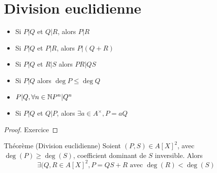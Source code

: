\documentclass[]{report}
\begin{document}
    \section{Division euclidienne}

    \begin{df}{}{}
        $(P,Q)\in A[X]$. On dit que $P|Q$ ($P$ divise $Q$) si $$\exists R\in A[X],Q=PR\text{ (Pour $Q\neq0$)$$
    \end{df}

    \begin{prop}{}{}
        \begin{itemize}
            \item Si $P|Q$ et $Q|R$, alors $P|R$
            \item Si $P|Q$ et $P|R$, alors $P|(Q+R)$
            \item Si $P|Q$ et $R|S$ alors $PR|QS$
            \item Si $P|Q$ alors $\deg P \le \deg Q$
            \item $P|Q, \forall n\in\mathbb{N} P^n|Q^n$
            \item Si $P|Q$ et $Q|P$, alors $\exists a\in A^\times,P=aQ$
        \end{itemize}
    \end{prop}

    \begin{proof}
        Exercice
    \end{proof}

    \begin{tm}{Théorème (Division euclidienne)}{}
        Soient $(P,S)\in A[X]^2$, avec $\deg(P)\ge\deg(S)$, coefficient dominant de $S$ inversible. Alors $$\exists(Q,R\in A[X]^2,P=QS+R\text{ avec $\deg(R)<\deg(S)$}$$
    \end{tm}
\end{document}
